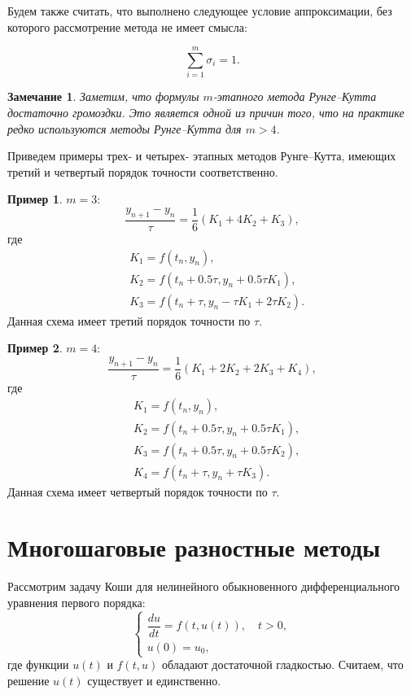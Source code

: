 \documentclass[11pt,a4paper,twoside]{report}
\numberwithin{equation}{section}
\theoremstyle{definition}
\newtheorem{example}{Пример}[section]
\theoremstyle{plain}
\newtheorem*{note*}{Замечание}
\newcommand{\bigO}[1]{\ensuremath{\operatorname{O}\bigl(#1\bigr)}}
\begin{document}
Будем также считать, что выполнено следующее условие аппроксимации,
без которого рассмотрение метода не имеет смысла:

%
$$
    \sum\limits_{i=1}^{m} \sigma_i = 1.
$$
%
\begin{note*}
%
    Заметим, что формулы $m$-этапного метода Рунге--Кутта достаточно громоздки.
    Это является одной из причин того, что на практике редко используются
    методы Рунге--Кутта для $m > 4$.
%
\end{note*}
%
Приведем примеры трех- и четырех- этапных методов Рунге--Кутта, имеющих третий и
четвертый порядок точности соответственно.
%
\begin{example}
    $m=3$:
    $$
        \dfrac{y_{n+1} - y_n}{\tau} = \frac16(K_1 + 4K_2 + K_3),
    $$
    где
    $$
        \begin{aligned}
            &K_1 = f(t_n, y_n), \\
            &K_2 = f(t_n + 0.5 \tau, y_n + 0.5 \tau K_1), \\
            &K_3 = f(t_n + \tau, y_n - \tau K_1 + 2\tau K_2).
        \end{aligned}
    $$
    Данная схема имеет третий порядок точности по $\tau$.%
\end{example}
%

%
\begin{example}
    $m=4$:
    $$
        \dfrac{y_{n+1} - y_n}{\tau} = \frac16 (K_1 + 2K_2 + 2K_3 + K_4),
    $$
    где
    $$
        \begin{aligned}
            &K_1 = f(t_n, y_n), \\
            &K_2 = f(t_n+0.5\tau, y_n + 0.5\tau K_1), \\
            &K_3 = f(t_n + 0.5 \tau, y_n + 0.5 \tau K_2), \\
            &K_4 = f(t_n + \tau, y_n + \tau K_3).
        \end{aligned}
    $$
    Данная схема имеет четвертый порядок точности по $\tau$.%
\end{example}
%
%
\section{Многошаговые разностные методы}
%
\label{Many_steps}
Рассмотрим задачу Коши для нелинейного обыкновенного дифференциального уравнения
первого порядка:
\begin{equation}
%
    \label{multi_step}
    \begin{cases}
        \dfrac{du}{dt} = f(t, u(t)), \quad t > 0, \\
        u(0) = u_0, %
    \end{cases}
\end{equation}
%
где функции $u(t)$ и $f(t, u)$ обладают достаточной гладкостью. Считаем,
что решение $u(t)$ существует и единственно.
\end{document}
